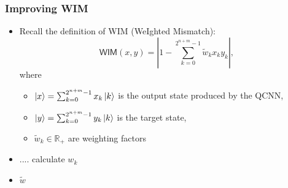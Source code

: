 \documentclass{beamer}
\begin{document}
\begin{frame}
\frametitle{Improving WIM}
\begin{itemize}
\item Recall the definition of \alert{WIM} (\alert{W}e\alert{I}ghted \alert{M}ismatch):
\begin{equation}
\mathsf{WIM}(x,y) =  \left\vert 1 - \sum_{k=0}^{2^{n+m}-1} \tilde{w}_k x_k y_k \right \vert, 
\end{equation}
where
\begin{itemize}
\item $\ket{x} = \sum_{k=0}^{2^{n+m}-1} x_k \ket{k} $ is the output state produced by the QCNN,
\item $\ket{y} = \sum_{k=0}^{2^{n+m}-1} y_k \ket{k} $ is the target state, 
\item $\tilde{w}_k \in \mathbb{R}_+$ are weighting factors 
\end{itemize}
\item .... calculate $w_k$
\item $\tilde{w}$
\end{itemize}
\end{frame}
\end{document}
